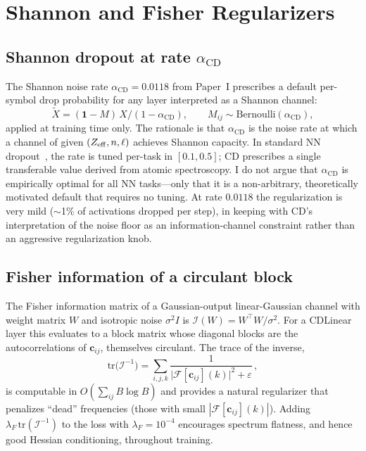 \documentclass[aps,prx,onecolumn,11pt,nofootinbib,longbibliography]{revtex4-2}
\newcommand{\Ind}{\mathbf{1}}
\newcommand{\alphaCD}{\alpha_{\mathrm{CD}}}
\newcommand{\F}{\mathcal{F}}
\begin{document}
\section{Shannon and Fisher Regularizers}
\label{sec:reg}

\subsection{Shannon dropout at rate $\alphaCD$}

The Shannon noise rate $\alphaCD = 0.0118$ from Paper~I prescribes a
default per-symbol drop probability for any layer interpreted as a Shannon
channel:
\begin{equation}
\tilde X = (\Ind - M)\,X / (1 - \alphaCD), \qquad
M_{ij} \sim \mathrm{Bernoulli}(\alphaCD),
\label{eq:shannon-dropout}
\end{equation}
applied at training time only.  The rationale is that $\alphaCD$ is the
noise rate at which a channel of given $(Z_{\rm eff}, n, \ell)$ achieves
Shannon capacity.  In standard NN dropout~\cite{Srivastava2014}, the rate
is tuned per-task in $[0.1, 0.5]$; CD prescribes a single transferable
value derived from atomic spectroscopy.  I do not argue that
$\alphaCD$ is empirically optimal for all NN tasks---only that it is a
non-arbitrary, theoretically motivated default that requires no tuning.
At rate $0.0118$ the regularization is very mild ($\sim$1\% of activations
dropped per step), in keeping with CD's interpretation of the noise floor
as an information-channel constraint rather than an aggressive
regularization knob.

\subsection{Fisher information of a circulant block}

The Fisher information matrix of a Gaussian-output linear-Gaussian channel
with weight matrix $W$ and isotropic noise $\sigma^2 I$ is
$\mathcal{I}(W) = W^\top W / \sigma^2$.  For a CDLinear layer this evaluates
to a block matrix whose diagonal blocks are the autocorrelations of
$\mathbf{c}_{ij}$, themselves circulant.  The trace of the inverse,
\begin{equation}
\mathrm{tr}\bigl(\mathcal{I}^{-1}\bigr)
= \sum_{i,j,k}
\frac{1}{\bigl|\F[\mathbf{c}_{ij}](k)\bigr|^2 + \varepsilon}\,,
\label{eq:fisher}
\end{equation}
is computable in $O(\sum_{ij}B \log B)$ and provides a natural regularizer
that penalizes ``dead'' frequencies (those with small
$|\F[\mathbf{c}_{ij}](k)|$).  Adding $\lambda_F\,\mathrm{tr}(\mathcal{I}^{-1})$
to the loss with $\lambda_F = 10^{-4}$ encourages spectrum flatness, and
hence good Hessian conditioning, throughout training.
\end{document}
